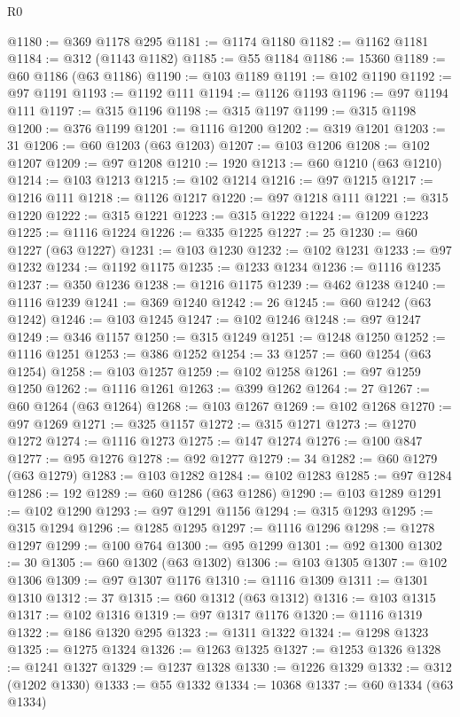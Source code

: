 \begin{lexlean}{R0}
\begin{coremodule}
@1180 := @369 @1178 @295
@1181 := @1174 @1180
@1182 := @1162 @1181
@1184 := @312 (@1143 @1182)
@1185 := @55 @1184
@1186 := 15360
@1189 := @60 @1186 (@63 @1186)
@1190 := @103 @1189
@1191 := @102 @1190
@1192 := @97 @1191
@1193 := @1192 @111
@1194 := @1126 @1193
@1196 := @97 @1194 @111
@1197 := @315 @1196
@1198 := @315 @1197
@1199 := @315 @1198
@1200 := @376 @1199
@1201 := @1116 @1200
@1202 := @319 @1201
@1203 := 31
@1206 := @60 @1203 (@63 @1203)
@1207 := @103 @1206
@1208 := @102 @1207
@1209 := @97 @1208
@1210 := 1920
@1213 := @60 @1210 (@63 @1210)
@1214 := @103 @1213
@1215 := @102 @1214
@1216 := @97 @1215
@1217 := @1216 @111
@1218 := @1126 @1217
@1220 := @97 @1218 @111
@1221 := @315 @1220
@1222 := @315 @1221
@1223 := @315 @1222
@1224 := @1209 @1223
@1225 := @1116 @1224
@1226 := @335 @1225
@1227 := 25
@1230 := @60 @1227 (@63 @1227)
@1231 := @103 @1230
@1232 := @102 @1231
@1233 := @97 @1232
@1234 := @1192 @1175
@1235 := @1233 @1234
@1236 := @1116 @1235
@1237 := @350 @1236
@1238 := @1216 @1175
@1239 := @462 @1238
@1240 := @1116 @1239
@1241 := @369 @1240
@1242 := 26
@1245 := @60 @1242 (@63 @1242)
@1246 := @103 @1245
@1247 := @102 @1246
@1248 := @97 @1247
@1249 := @346 @1157
@1250 := @315 @1249
@1251 := @1248 @1250
@1252 := @1116 @1251
@1253 := @386 @1252
@1254 := 33
@1257 := @60 @1254 (@63 @1254)
@1258 := @103 @1257
@1259 := @102 @1258
@1261 := @97 @1259 @1250
@1262 := @1116 @1261
@1263 := @399 @1262
@1264 := 27
@1267 := @60 @1264 (@63 @1264)
@1268 := @103 @1267
@1269 := @102 @1268
@1270 := @97 @1269
@1271 := @325 @1157
@1272 := @315 @1271
@1273 := @1270 @1272
@1274 := @1116 @1273
@1275 := @147 @1274
@1276 := @100 @847
@1277 := @95 @1276
@1278 := @92 @1277
@1279 := 34
@1282 := @60 @1279 (@63 @1279)
@1283 := @103 @1282
@1284 := @102 @1283
@1285 := @97 @1284
@1286 := 192
@1289 := @60 @1286 (@63 @1286)
@1290 := @103 @1289
@1291 := @102 @1290
@1293 := @97 @1291 @1156
@1294 := @315 @1293
@1295 := @315 @1294
@1296 := @1285 @1295
@1297 := @1116 @1296
@1298 := @1278 @1297
@1299 := @100 @764
@1300 := @95 @1299
@1301 := @92 @1300
@1302 := 30
@1305 := @60 @1302 (@63 @1302)
@1306 := @103 @1305
@1307 := @102 @1306
@1309 := @97 @1307 @1176
@1310 := @1116 @1309
@1311 := @1301 @1310
@1312 := 37
@1315 := @60 @1312 (@63 @1312)
@1316 := @103 @1315
@1317 := @102 @1316
@1319 := @97 @1317 @1176
@1320 := @1116 @1319
@1322 := @186 @1320 @295
@1323 := @1311 @1322
@1324 := @1298 @1323
@1325 := @1275 @1324
@1326 := @1263 @1325
@1327 := @1253 @1326
@1328 := @1241 @1327
@1329 := @1237 @1328
@1330 := @1226 @1329
@1332 := @312 (@1202 @1330)
@1333 := @55 @1332
@1334 := 10368
@1337 := @60 @1334 (@63 @1334)

\end{coremodule}
\end{lexlean}
